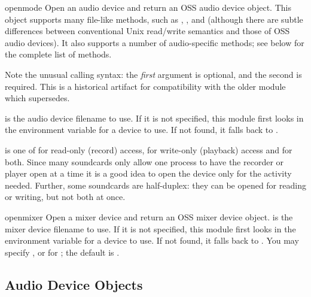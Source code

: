 \begin{funcdesc}{open}{mode}
Open an audio device and return an OSS audio device object.  This
object supports many file-like methods, such as ,
, and  (although there are subtle
differences between conventional Unix read/write semantics and those of
OSS audio devices).  It also supports a number of audio-specific
methods; see below for the complete list of methods.

Note the unusual calling syntax: the \emph{first} argument is optional,
and the second is required.  This is a historical artifact for
compatibility with the older  module which
 supersedes.  %

 is the audio device filename to use.  If it is not
specified, this module first looks in the environment variable
 for a device to use.  If not found, it falls back to
.

 is one of  for read-only (record) access,
 for write-only (playback) access and  for both.
Since many soundcards only allow one process to have the recorder or
player open at a time it is a good idea to open the device only for the
activity needed.  Further, some soundcards are half-duplex: they can be
opened for reading or writing, but not both at once.
\end{funcdesc}

\begin{funcdesc}{openmixer}{}
Open a mixer device and return an OSS mixer device object.  
 is the mixer device filename to use.  If it is
not specified, this module first looks in the environment variable
 for a device to use.  If not found, it falls back to
.  You may specify ,  or
 for ; the default is .


\end{funcdesc}

\subsection{Audio Device Objects \label{ossaudio-device-objects}}

